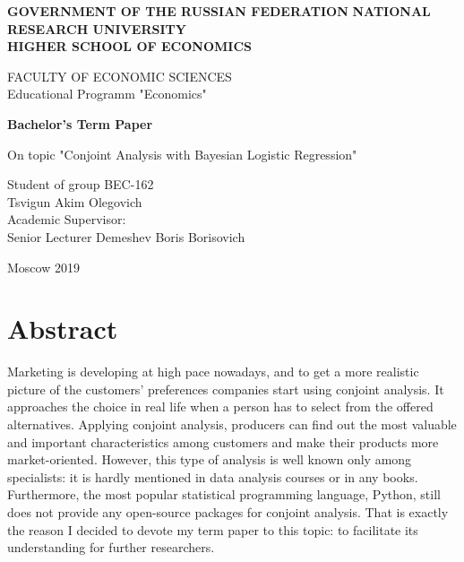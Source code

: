 \documentclass[a4paper, 12pt]{extreport}
\begin{document}
\thispagestyle{empty}
\begin{center}

	\textbf{GOVERNMENT OF THE RUSSIAN FEDERATION}
	\vspace{2ex}
	\textbf{NATIONAL RESEARCH UNIVERSITY \\ HIGHER SCHOOL OF ECONOMICS}

	\vspace{8ex}
	\begin{center}
	FACULTY OF ECONOMIC SCIENCES\\
	Educational Programm "Economics"
\end{center}
\end{center}
\vspace{8ex}

\begin{center}
	{\textbf{Bachelor's Term Paper
	}}
	\vspace{1ex}

	On topic "Conjoint Analysis with Bayesian Logistic Regression"
\end{center}
	\vspace{6ex}
\begin{flushright}
	\noindent
	Student of group BEC-162\\Tsvigun Akim Olegovich\\
	\vspace{2ex}
	Academic Supervisor:\\
	Senior Lecturer Demeshev Boris Borisovich

\end{flushright}

	\vfill

\begin{center}
		Moscow 2019

\end{center}

\newpage
\tableofcontents
\clearpage

\section{Abstract}

Marketing is developing at high pace nowadays, and to get a more realistic picture of the customers' preferences companies start using conjoint analysis. It approaches the choice in real life when a person
has to select from the offered alternatives. Applying conjoint analysis, producers can find out the most valuable and important characteristics among customers and make their products more market-oriented.
However, this type of analysis is well known only among specialists: it is hardly mentioned in data analysis courses or in any books. Furthermore, the most popular statistical programming language, Python, still does not
provide any open-source packages for conjoint analysis. That is exactly the reason I decided to devote my term paper to this topic: to facilitate its understanding for further researchers.
\end{document}
